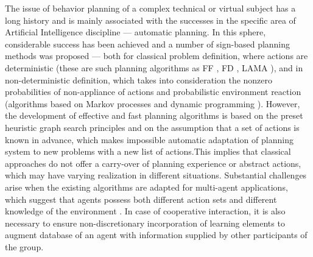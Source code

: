 \documentclass[review]{elsarticle}
\begin{document}
The issue of behavior planning of a complex technical or virtual subject has a long history and is mainly associated with the successes in the specific area of Artificial Intelligence discipline --- automatic planning. In this sphere, considerable success has been achieved and a number of sign-based planning methods was proposed --- both for classical problem definition, where actions are deterministic (these are such planning algorithms as FF \cite{Hoffmann2001}, FD \cite{Helmert2006}, LAMA \cite{Richter2010}), and in non-deterministic definition, which takes into consideration the nonzero probabilities of non-appliance of actions and probabilistic environment reaction (algorithms based on Markov processes and dynamic programming \cite{Barto1995,Bonet2009}). However, the development of effective and fast planning algorithms is based on the preset heuristic graph search principles and on the assumption that a set of actions is known in advance, which makes impossible automatic adaptation of planning system to new problems with a new list of actions.This implies that classical approaches do not offer a carry-over of planning experience or abstract actions, which may have varying realization in different situations. Substantial challenges arise when the existing algorithms are adapted for multi-agent applications, which suggest that agents possess both different action sets and different knowledge of the environment \cite{Brafman2015}. In case of cooperative interaction, it is also necessary to ensure non-discretionary incorporation of learning elements to augment database of an agent with information supplied by other participants of the group.
\end{document}
